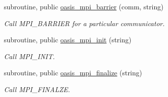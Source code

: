 \begin{DoxyCompactItemize}
subroutine, public \hyperlink{classmod__oasis__mpi_aaf477847380fbbbc1341520b0b3e66da}{oasis\+\_\+mpi\+\_\+barrier} (comm, string)
\begin{DoxyCompactList}\small\item\em Call M\+P\+I\+\_\+\+B\+A\+R\+R\+I\+E\+R for a particular communicator. \end{DoxyCompactList}\item 
subroutine, public \hyperlink{classmod__oasis__mpi_aaf45f20e0000b32e71ec9ea8e806f57c}{oasis\+\_\+mpi\+\_\+init} (string)
\begin{DoxyCompactList}\small\item\em Call M\+P\+I\+\_\+\+I\+N\+I\+T. \end{DoxyCompactList}\item 
subroutine, public \hyperlink{classmod__oasis__mpi_a0a601a3f718c0704db99a21b2c43fbcd}{oasis\+\_\+mpi\+\_\+finalize} (string)
\begin{DoxyCompactList}\small\item\em Call M\+P\+I\+\_\+\+F\+I\+N\+A\+L\+Z\+E. \end{DoxyCompactList}\end{DoxyCompactItemize}
